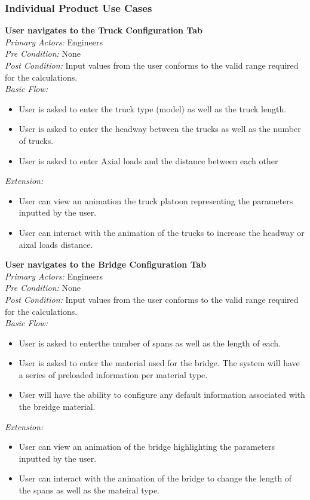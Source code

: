 \documentclass[12pt]{article}
\begin{document}
\subsubsection{Individual Product Use Cases}


\noindent
\textbf{User navigates to the Truck Configuration Tab} \\
\emph{  Primary Actors:} Engineers\\
\emph{  Pre Condition:} None\\
\emph{  Post Condition:} Input values from the user conforms to the valid range required for the calculations.\\ 
\emph{  Basic Flow:} 
\begin{itemize}
\item User is asked to enter the truck type (model) as well as the truck length.
\item User is asked to enter the headway between the trucks as well as the number of trucks. 
\item User is asked to enter Axial loads and the distance between each other
\end{itemize}
\emph{  Extension:}
\begin{itemize}
\item User can view an animation the truck platoon representing the parameters inputted by the user.
\item User can interact with the animation of the trucks to increase the headway or aixal loads distance. 
\end{itemize}

\noindent
\textbf{User navigates to the Bridge Configuration Tab} \\
\emph{  Primary Actors:} Engineers\\
\emph{  Pre Condition:} None\\
\emph{  Post Condition:} Input values from the user conforms to the valid range required for the calculations.\\ 
\emph{  Basic Flow:} 
\begin{itemize}
\item User is asked to enterthe number of spans as well as the length of each.
\item User is asked to enter the material used for the bridge. The system will have a series of preloaded information per material type. 
\item User will have the ability to configure any default information associated with the breidge material. 
\end{itemize}
\emph{  Extension:}
\begin{itemize}
\item User can view an animation of the bridge highlighting the parameters inputted by the user.
\item User can interact with the animation of the bridge to change the length of the spans as well as the mateiral type.
\end{itemize}
\end{document}
